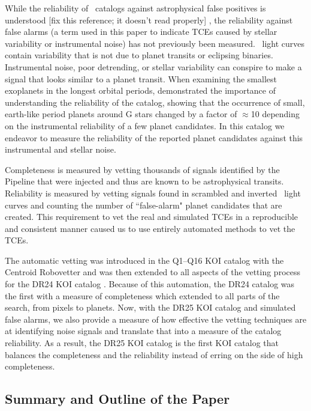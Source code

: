 While the reliability of \Kepler\ catalogs against astrophysical false positives is understood [fix this reference; it doesn't read properly] \citet[see e.g.][]{Morton2016}, the reliability against false alarms (a term used in this paper to indicate TCEs caused by stellar variability or instrumental noise) has not previously been measured.  \Kepler\ light curves contain variability that is not due to planet transits or eclipsing binaries.  Instrumental noise, poor detrending, or stellar variability can conspire to make a signal that looks similar to a planet transit. When examining the smallest exoplanets in the longest orbital periods, \citet{Burke2015} demonstrated the importance of understanding the reliability of the catalog, showing that the occurrence of small, earth-like period planets around G stars changed by a factor of $\approx$10 depending on the instrumental reliability of a few planet candidates.  In this catalog we endeavor to measure the reliability of the reported planet candidates against this instrumental and stellar noise.  


Completeness is measured by vetting thousands of signals identified by the \Kepler Pipeline that were injected and thus are known to be astrophysical transits. Reliability is measured by vetting signals found in scrambled and inverted \Kepler\ light curves and counting the number of ``false-alarm" planet candidates that are created. This requirement to vet the real and simulated TCEs in a reproducible and consistent manner caused us to use entirely automated methods to vet the TCEs.  

The automatic vetting was introduced in the Q1--Q16 KOI catalog \citep{Mullally2015cat} with the Centroid Robovetter and was then extended to all aspects of the vetting process for the DR24 KOI catalog \citep{Coughlin2016}. Because of this automation, the DR24 catalog was the first with a measure of completeness which extended to all parts of the search, from pixels to planets.  Now, with the DR25 KOI catalog and simulated false alarms, we also provide a measure of how effective the vetting techniques are at identifying noise signals and translate that into a measure of the catalog reliability. As a result, the DR25 KOI catalog is the first KOI catalog that balances the completeness and the reliability instead of erring on the side of high completeness. 

\subsection{Summary and Outline of the Paper}

